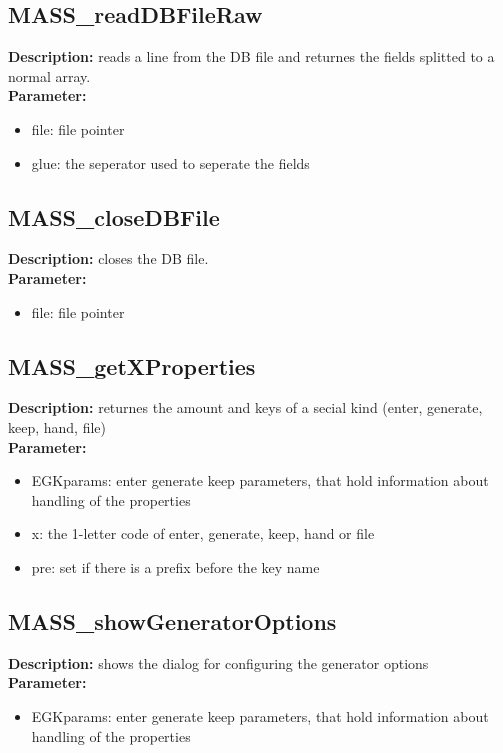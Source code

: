 \subsection{MASS\_readDBFileRaw}
\textbf{Description:} reads a line from the DB file and returnes the fields splitted to a normal array.\\
\textbf{Parameter:}
\begin{itemize}
\item file: file pointer
\item glue: the seperator used to seperate the fields
\end{itemize}

\subsection{MASS\_closeDBFile}
\textbf{Description:} closes the DB file.\\
\textbf{Parameter:}
\begin{itemize}
\item file: file pointer
\end{itemize}

\subsection{MASS\_getXProperties}
\textbf{Description:} returnes the amount and keys of a secial kind (enter, generate, keep, hand, file)\\
\textbf{Parameter:}
\begin{itemize}
\item EGKparams: enter generate keep parameters, that hold information about handling of the properties
\item x: the 1-letter code of enter, generate, keep, hand or file
\item pre: set if there is a prefix before the key name
\end{itemize}

\subsection{MASS\_showGeneratorOptions}
\textbf{Description:} shows the dialog for configuring the generator options\\
\textbf{Parameter:}
\begin{itemize}
\item EGKparams: enter generate keep parameters, that hold information about handling of the properties
\end{itemize}

